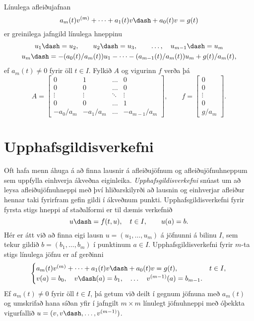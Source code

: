 Línulega afleiðujafnan
 $$a_m(t)v^{(m)}+\cdots+a_1(t)v\dash+ a_0(t)v=g(t)
 $$
er greinilega jafngild línulega hneppinu
\begin{gather*}\label{1.3.4}
u_1\dash = u_2,\qquad  u_2\dash = u_3, \qquad \dots, \quad
u_{m-1}\dash = u_m\\
u_m\dash
=-(a_0(t)/a_m(t))u_1-\cdots-(a_{m-1}(t)/a_m(t))u_m+g(t)/a_m(t),\nonumber 
\end{gather*}
ef $a_m(t)\neq 0$ fyrir öll $t\in I$.
Fylkið $A$ og vigurinn $f$ verða þá 
\begin{equation*}A=\left[\begin{matrix}
0&1&\dots&0\\
0&0&\dots&0\\
\vdots&\vdots&\ddots&\vdots\\
0&0&\dots&1\\
-a_0/a_m&-a_1/a_m&\dots&-a_{m-1}/a_m
\end{matrix}\right],
\qquad
f=\left[\begin{matrix}
0\\
0\\
\vdots\\
0\\
g/a_m
\end{matrix}\right].\label{1.3.5}
\end{equation*}
 
\section{Upphafsgildisverkefni}

\noindent
Oft hafa menn áhuga á að finna lausnir á afleiðujöfnum og
afleiðujöfnuhneppum sem uppfylla einhverja ákveðna eiginleika.  {\it
Upphafsgildisverkefni}  snúast um að leysa afleiðujöfnuhneppi með því
hliðarskilyrði að lausnin og einhverjar afleiður hennar taki fyrirfram
gefin gildi í ákveðnum punkti.   Upphafsgildisverkefni fyrir fyrsta
stigs hneppi af staðalformi er til dæmis verkefnið
\begin{equation*}
u\dash=f(t,u), \quad t\in I, \qquad u(a)=b.
\label{1.4.1}
\end{equation*}
Hér er átt við að finna eigi lausn $u=(u_1,\dots,u_m)$ á jöfnunni á
bilinu $I$, sem tekur gildið $b=(b_1,\dots,b_m)$ í punktinum $a\in I$.
Upphafsgildisverkefni fyrir $m$-ta stigs línulega jöfnu er af gerðinni
\begin{equation*}
\begin{cases} a_m(t)v^{(m)}+\cdots+a_1(t)v\dash+a_0(t)v=g(t), & t\in I,\\
v(a)=b_0, \quad v\dash(a)=b_1, \quad \dots \quad  v^{(m-1)}(a)=b_{m-1}.&
\end{cases}
\label{1.4.2}
\end{equation*}
Ef $a_m(t)\neq 0$ fyrir öll $t\in I$, þá getum við deilt í gegnum
jöfnuna með $a_m(t)$ og umskrifað hana síðan yfir í jafngilt $m\times m$
línulegt jöfnuhneppi með óþekkta vigurfallið
$u=(v,v\dash,\dots,v^{(m-1)})$. 


